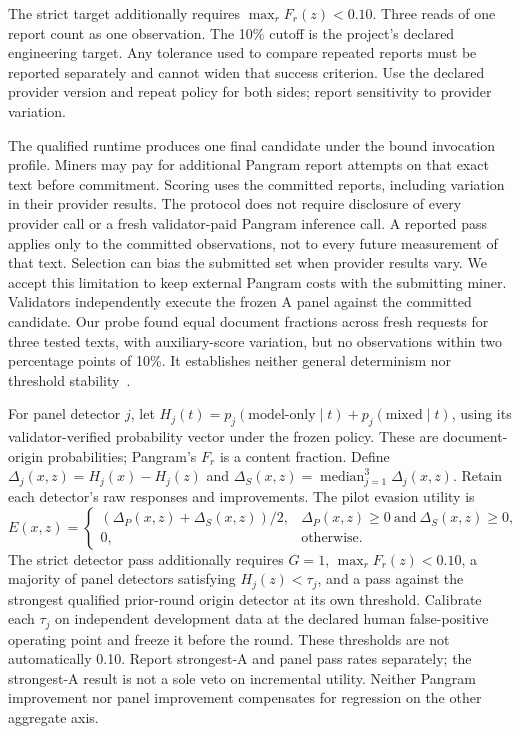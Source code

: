 The strict target additionally requires
\(\max_r F_r(z) < 0.10\). Three reads of one report
count as one observation. The 10\% cutoff is the project's declared
engineering target. Any tolerance used to compare repeated reports must
be reported separately and cannot widen that success criterion. Use the
declared provider version and repeat policy for both sides; report
sensitivity to provider variation.

The qualified runtime produces one final candidate under the bound
invocation profile. Miners may pay for additional Pangram report attempts
on that exact text before commitment. Scoring uses the committed reports,
including variation in their provider results. The protocol does not
require disclosure of every provider call or a fresh validator-paid
Pangram inference call. A
reported pass applies only to the committed observations, not to every
future measurement of that text. Selection can bias the submitted set
when provider results vary. We accept this limitation to keep external
Pangram costs with the submitting miner. Validators independently
execute the frozen A panel against the committed candidate. Our probe found equal document fractions
across fresh requests for three tested texts, with auxiliary-score
variation, but no observations within two percentage points of 10\%.
It establishes neither general determinism nor threshold stability~\cite{repeatability}.

For panel detector \(j\), let
\(H_j(t)=p_j(\text{model-only}\mid t)+p_j(\text{mixed}\mid t)\),
using its validator-verified probability vector under the frozen policy.
These are document-origin probabilities; Pangram's \(F_r\) is a
content fraction. Define
\(\Delta_j(x,z)=H_j(x)-H_j(z)\) and
\(\Delta_S(x,z)=\operatorname{median}_{j=1}^{3}\Delta_j(x,z)\).
Retain each detector's raw responses and improvements. The pilot evasion
utility is
\begin{equation}\label{eq:joint-evasion-utility}
 E(x,z)=
 \begin{cases}
 (\Delta_P(x,z)+\Delta_S(x,z))/2,
   &\Delta_P(x,z)\geq0\ \text{and}\ \Delta_S(x,z)\geq0,\\
 0,&\text{otherwise}.
 \end{cases}
\end{equation}
The strict detector pass additionally requires \(G=1\),
\(\max_r F_r(z)<0.10\),
a majority of panel detectors satisfying \(H_j(z)<\tau_j\), and a pass
against the strongest qualified prior-round origin detector at its own threshold.
Calibrate each \(\tau_j\) on independent development data at the
declared human false-positive operating point and freeze it before the
round. These thresholds are not automatically 0.10. Report strongest-A
and panel pass rates separately; the strongest-A result is not a sole
veto on incremental utility. Neither Pangram improvement nor panel
improvement compensates for regression on the other aggregate axis.

